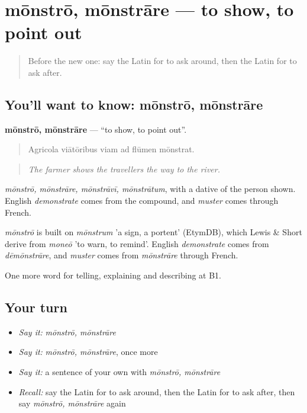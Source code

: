 \section[mōnstrō, mōnstrāre]{mōnstrō, mōnstrāre — to show, to point out}

\label{lesson:LA-C451-monstro}



\begin{quote}
Before the new one: say the Latin for to ask around, then the Latin for to ask after.
\end{quote}

\subsection*{You'll want to know: mōnstrō, mōnstrāre}
\textbf{mōnstrō, mōnstrāre} — \textquotedblleft{}to show, to point out\textquotedblright{}.

\begin{quote}
Agricola viātōribus viam ad flūmen mōnstrat.
\end{quote}

\begin{quote}
\emph{The farmer shows the travellers the way to the river.}
\end{quote}

\emph{mōnstrō, mōnstrāre, mōnstrāvī, mōnstrātum}, with a dative of the person shown. English \emph{demonstrate} comes from the compound, and \emph{muster} comes through French.

\begin{cousinweb}
\emph{mōnstrō} is built on \emph{mōnstrum} 'a sign, a portent' (EtymDB), which Lewis \& Short derive from \emph{moneō} 'to warn, to remind'. English \emph{demonstrate} comes from \emph{dēmōnstrāre}, and \emph{muster} comes from \emph{mōnstrāre} through French.
\end{cousinweb}

\begin{grammarlens}[title={What you've built}]
One more word for telling, explaining and describing at B1.
\end{grammarlens}

\subsection*{Your turn}
\begin{itemize}
\raggedright
  \item \emph{Say it:} \emph{mōnstrō, mōnstrāre}
  \item \emph{Say it:} \emph{mōnstrō, mōnstrāre}, once more
  \item \emph{Say it:} a sentence of your own with \emph{mōnstrō, mōnstrāre}
  \item \emph{Recall:} say the Latin for to ask around, then the Latin for to ask after, then say \emph{mōnstrō, mōnstrāre} again
\end{itemize}


